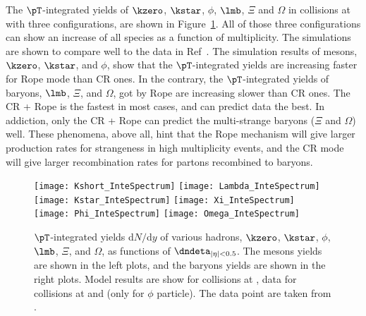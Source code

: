 \documentclass[ALICE,manyauthors]{StrinJet}
\begin{document}
The $\pT$-integrated yields of $\kzero$, $\kstar$, $\phi$, $\lmb$, $\Xi$ and $\Omega$ in \pp collisions at \seven with three configurations, are shown in Figure~\ref{fig:InclIntePar}. All of those three configurations can show an increase of all species as a function of multiplicity. The simulations are shown to compare well to the  data in Ref~\cite{ALICE:2016fzo, ALICE:2019etb}. The simulation results of  mesons, $\kzero$, $\kstar$, and $\phi$, show that the $\pT$-integrated yields are increasing faster for Rope mode than CR ones. In the contrary, the $\pT$-integrated yields of baryons, $\lmb$, $\Xi$, and $\Omega$, got by Rope are increasing slower than CR ones. The CR + Rope is the fastest in most cases, and can predict data the best. In addiction, only the CR + Rope can predict the multi-strange baryons ($\Xi$ and $\Omega$) well. These phenomena, above all, hint that the Rope mechanism will give larger production rates for strangeness in high multiplicity events, and the CR mode will give larger recombination rates for partons recombined to baryons.
\begin{figure}[ht]
	\begin{center}
		\texttt{[image: Kshort\_InteSpectrum]}
		\texttt{[image: Lambda\_InteSpectrum]}
		\texttt{[image: Kstar\_InteSpectrum]}
		\texttt{[image: Xi\_InteSpectrum]}
		\texttt{[image: Phi\_InteSpectrum]}
		\texttt{[image: Omega\_InteSpectrum]}
	\end{center}
	\caption{$\pT$-integrated yields d$N/$d$y$ of various hadrons, $\kzero$, $\kstar$, $\phi$, $\lmb$, $\Xi$, and $\Omega$, as functions of $\dndeta_{|\eta| < 0.5}$. The mesons yields are shown in the left plots, and the baryons yields are shown in the right plots. Model results are show for \pp collisions at \seven, data for \pp collisions at \seven and \thirteen (only for $\phi$ particle). The data point are taken from \cite{ALICE:2016fzo, ALICE:2019etb}.}
	\label{fig:InclIntePar}
\end{figure}
\end{document}
